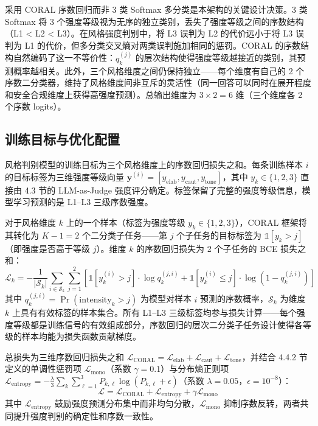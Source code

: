 \documentclass[fontset=fandol,type=master,campus=shenzhen,etitleauto=true]{hithesisbook}
\begin{document}
采用 CORAL 序数回归而非 3 类 Softmax 多分类是本架构的关键设计决策。3 类 Softmax 将 3 个强度等级视为无序的独立类别，丢失了强度等级之间的序数结构（L1 < L2 < L3）。在风格强度判别中，将 L3 误判为 L2 的代价远小于将 L3 误判为 L1 的代价，但多分类交叉熵对两类误判施加相同的惩罚。CORAL 的序数结构自然编码了这一不等价性：$q_k^{(j)}$ 的层次结构使得强度等级越接近的类别，其预测概率越相关。此外，三个风格维度之间仍保持独立------每个维度有自己的 2 个序数二分类器，维持了风格维度间非互斥的灵活性（同一回答可以同时在展开程度和安全合规维度上获得高强度预测）。总输出维度为 $3 \times 2 = 6$ 维（三个维度各 2 个序数 logits）。

\subsection{训练目标与优化配置}\label{ux8badux7ec3ux76eeux6807ux4e0eux4f18ux5316ux914dux7f6e-1}

风格判别模型的训练目标为三个风格维度上的序数回归损失之和。每条训练样本 $i$ 的目标标签为三维强度等级向量 $\mathbf{y}^{(i)} = [y_{\text{elab}}, y_{\text{caut}}, y_{\text{tone}}]$，其中 $y_k \in \{1,2,3\}$ 直接由 4.3 节的 LLM-as-Judge 强度评分确定。标签保留了完整的强度等级信息，模型学习预测的是 L1--L3 三级序数强度。

对于风格维度 $k$ 上的一个样本（标签为强度等级 $y_k \in \{1,2,3\}$），CORAL 框架将其转化为 $K-1=2$ 个二分类子任务------第 $j$ 个子任务的目标标签为 $\mathbb{1}[y_k > j]$（即强度是否高于等级 $j$）。维度 $k$ 的序数回归损失为 2 个子任务的 BCE 损失之和：
\begin{equation}
\mathcal{L}_k = -\frac{1}{|\mathcal{S}_k|} \sum_{i \in \mathcal{S}_k} \sum_{j=1}^{2} \left[ \mathbb{1}[y_k^{(i)} > j] \cdot \log q_k^{(j,i)} + \mathbb{1}[y_k^{(i)} \leq j] \cdot \log(1 - q_k^{(j,i)}) \right]
\end{equation}
其中 $q_k^{(j,i)} = \Pr(\text{intensity}_k > j)$ 为模型对样本 $i$ 预测的序数概率，$\mathcal{S}_k$ 为维度 $k$ 上具有有效标签的样本集合。所有 L1--L3 三级标签均参与损失计算------每个强度等级都是训练信号的有效组成部分，序数回归的层次二分类子任务设计使得各等级的样本均能为损失函数贡献梯度。

总损失为三维序数回归损失之和 $\mathcal{L}_{\text{CORAL}} = \mathcal{L}_{\text{elab}} + \mathcal{L}_{\text{caut}} + \mathcal{L}_{\text{tone}}$，并结合 4.4.2 节定义的单调性惩罚项 $\mathcal{L}_{\text{mono}}$（系数 $\gamma = 0.1$）与分布熵正则项 $\mathcal{L}_{\text{entropy}} = -\frac{\lambda}{3} \sum_{k} \sum_{\ell=1}^{3} P_{k,\ell} \log(P_{k,\ell} + \epsilon)$（系数 $\lambda = 0.05$，$\epsilon = 10^{-8}$）：
\begin{equation}
\mathcal{L} = \mathcal{L}_{\text{CORAL}} + \mathcal{L}_{\text{entropy}} + \gamma \mathcal{L}_{\text{mono}}
\end{equation}
其中 $\mathcal{L}_{\text{entropy}}$ 鼓励强度预测分布集中而非均匀分散，$\mathcal{L}_{\text{mono}}$ 抑制序数反转，两者共同提升强度判别的确定性和序数一致性。
\end{document}

